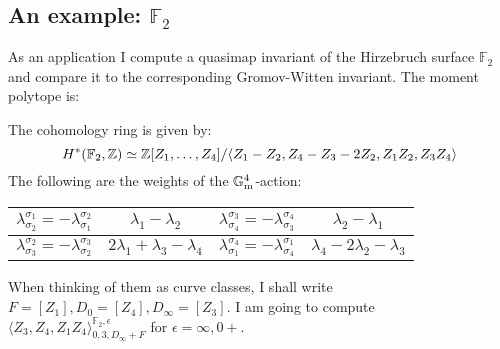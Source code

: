 \subsection{An example: $\mathbb F_2$} As an application I compute a quasimap invariant of the Hirzebruch surface $\mathbb F_2$ and compare it to the corresponding Gromov-Witten invariant. The moment polytope is:
\begin{center}
\end{center}
The cohomology ring is given by:
\[
 H^*(\mathbb F_2,\mathbb{Z})\simeq\mathbb{Z}[Z_1,\ldots,Z_4]/\langle Z_1-Z_2,Z_4-Z_3-2Z_2, Z_1Z_2,Z_3Z_4\rangle
\]
The following are the weights of the $\mathbb{G}_{\text{m}}^4$-action:

\begin{center}
 \begin{tabular}{||c|c||c|c||}
  \hline
  $\lambda^{\sigma_1}_{\sigma_2}=-\lambda^{\sigma_2}_{\sigma_1}$ & $\lambda_1-\lambda_2$ & $\lambda^{\sigma_3}_{\sigma_4}=-\lambda^{\sigma_4}_{\sigma_3}$ & $\lambda_2-\lambda_1$ \\
  \hline
  $\lambda^{\sigma_2}_{\sigma_3}=-\lambda^{\sigma_3}_{\sigma_2}$ & $2\lambda_1+\lambda_3-\lambda_4$ & $\lambda^{\sigma_4}_{\sigma_1}=-\lambda^{\sigma_1}_{\sigma_4}$ & $\lambda_4-2\lambda_2-\lambda_3$ \\
  \hline
 \end{tabular}
\end{center}

When thinking of them as curve classes, I shall write $F=[Z_1], D_0=[Z_4], D_\infty=[Z_3]$. I am going to compute $\langle Z_3,Z_4,Z_1Z_4\rangle^{\mathbb F_2,\epsilon}_{0,3,D_\infty+F}$ for $\epsilon=\infty,0+$.

